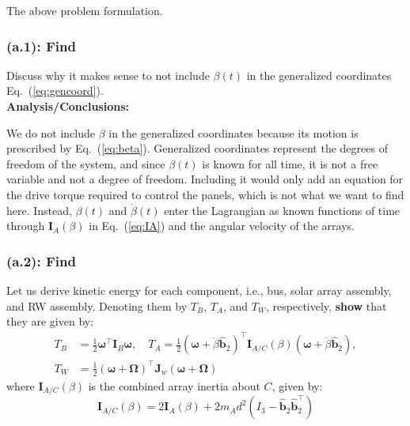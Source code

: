 \documentclass[titlepage]{article}
\begin{document}
The above problem formulation.

\subsubsection*{(a.1): Find}

Discuss why it makes sense to not include $\beta(t)$ in the generalized coordinates Eq.~(\ref{eq:gencoord}).\\

\textbf{Analysis/Conclusions:}\\

\begin{mdframed}[linewidth=1pt, innertopmargin=10pt, innerbottommargin=10pt]
	We do not include $\beta$ in the generalized coordinates because its motion is prescribed by Eq.~(\ref{eq:beta}). Generalized coordinates represent the degrees of freedom of the system, and since $\beta(t)$ is known for all time, it is not a free variable and not a degree of freedom. Including it would only add an equation for the drive torque required to control the panels, which is not what we want to find here. Instead, $\beta(t)$ and $\dot{\beta}(t)$ enter the Lagrangian as known functions of time through $\boldsymbol{I}_A(\beta)$ in Eq.~(\ref{eq:IA}) and the angular velocity of the arrays.
\end{mdframed}

\subsubsection*{(a.2): Find}

Let us derive kinetic energy for each component, i.e., bus, solar array assembly, and RW assembly. Denoting them by $T_B$, $T_A$, and $T_W$, respectively, \textbf{show} that they are given by:
\begin{equation}
	\begin{split}
		T_B&=\frac{1}{2}\boldsymbol{\omega}^\top\boldsymbol{I}_B\boldsymbol{\omega},\quad T_A=\frac{1}{2}\left(\boldsymbol{\omega}+\dot{\beta}\hat{\boldsymbol{b}}_2\right)^\top\boldsymbol{I}_{A/C}(\beta)\left(\boldsymbol{\omega}+\dot{\beta}\hat{\boldsymbol{b}}_2\right), \\
		T_W&=\frac{1}{2}\left(\boldsymbol{\omega}+\boldsymbol{\Omega}\right)^\top\boldsymbol{J}_w\left(\boldsymbol{\omega}+\boldsymbol{\Omega}\right)
	\end{split}
	\label{eq:T}
\end{equation}
where $\boldsymbol{I}_{A/C}(\beta)$ is the combined array inertia about $C$, given by:
\begin{equation}
	\boldsymbol{I}_{A/C}(\beta)=2\boldsymbol{I}_A(\beta)+2m_Ad^2\left(I_3-\hat{\boldsymbol{b}}_2\hat{\boldsymbol{b}}_2^\top\right)
	\label{eq:IAC}
\end{equation}
\end{document}
